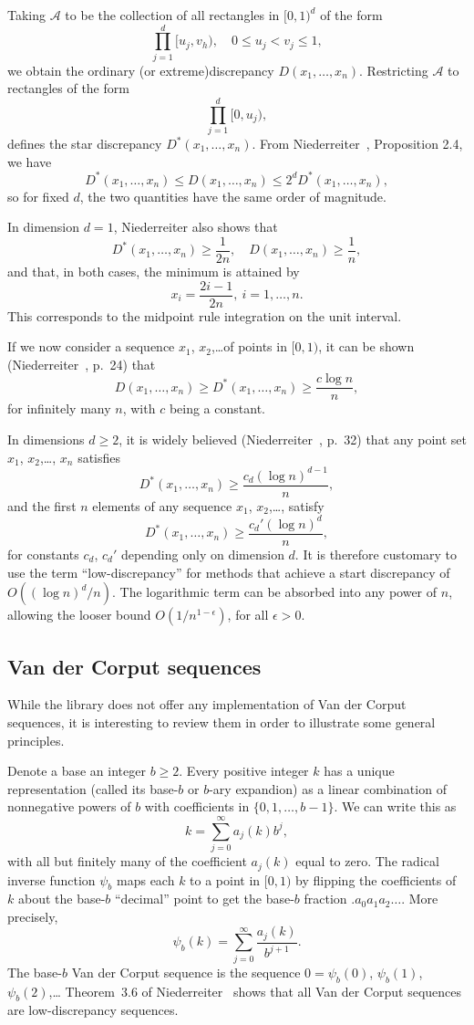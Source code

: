 Taking $\mathcal{A}$ to be the collection of all rectangles in
$[0,1)^d$ of the form
\[
\prod_{j = 1}^d [u_j, v_h),\quad 0 \leq u_j < v_j \leq 1,
\]
we obtain the ordinary (or extreme)discrepancy
$D(x_1,\ldots,x_n)$.
Restricting $\mathcal{A}$ to rectangles of the form
\[
\prod_{j = 1}^d [0,u_j),
\]
defines the star discrepancy
$D^*(x_1,\ldots,x_n)$.
From Niederreiter~\cite{Nied92}, Proposition 2.4, we have
\[
D^*(x_1,\ldots,x_n) \leq D(x_1,\ldots,x_n) \leq 2^d D^*(x_1,\ldots,x_n),
\]
so for fixed $d$, the two quantities have the same order of magnitude.

In dimension $d = 1$, Niederreiter also shows that
\[
D^*(x_1,\ldots,x_n) \geq \frac{1}{2n},\quad D(x_1,\ldots,x_n) \geq \frac{1}{n},
\]
and that, in both cases, the minimum is attained by
\[
x_i = \frac{2i-1}{2n},\ i = 1,\ldots,n.
\]
This corresponds to the midpoint rule integration on the unit
interval.

If we now consider a sequence $x_1$, $x_2$,\ldots of points in
$[0,1)$, it can be shown (Niederreiter~\cite{Nied92}, p.~24) that
\[
D(x_1,\ldots,x_n) \geq D^*(x_1,\ldots,x_n) \geq \frac{c \log n}{n},
\]
for infinitely many $n$, with $c$ being a constant.

In dimensions $d \geq 2$, it is widely believed
(Niederreiter~\cite{Nied92}, p.~32) that any point set $x_1$,
$x_2$,\ldots, $x_n$ satisfies
\[
D^*(x_1,\ldots,x_n) \geq \frac{c_d (\log n)^{d-1}}{n},
\]
and the first $n$ elements of any sequence $x_1$, $x_2$,\ldots,
satisfy
\[
D^*(x_1,\ldots,x_n) \geq \frac{c_d' (\log n)^{d}}{n},
\]
for constants $c_d$, $c_d'$ depending only on dimension $d$. It is
therefore customary to use the term ``low-discrepancy'' for methods
that achieve a start discrepancy of $O((\log n)^d/n)$.
The logarithmic term can be absorbed into any power of $n$, allowing
the looser bound $O(1/n^{1-\epsilon})$, for all $\epsilon > 0$.

\subsection{Van der Corput sequences}

While the library does not offer any implementation of Van der Corput
sequences, it is interesting to review them in order to illustrate
some general principles.

Denote a base an integer $b \geq 2$. Every positive integer $k$ has a
unique representation (called its base-$b$ or $b$-ary expandion) as a
linear combination of nonnegative powers of $b$ with coefficients in
$\lbrace 0, 1,\ldots, b-1 \rbrace$.
We can write this as
\[
k = \sum_{j = 0}^\infty a_j(k) b^j,
\]
with all but finitely many of the coefficient $a_j(k)$ equal to zero.
The radical inverse function $\psi_b$ maps each $k$ to a point in
$[0,1)$ by flipping the coefficients of $k$ about the base-$b$
``decimal'' point to get the base-$b$ fraction $.a_0a_1a_2\ldots$.
More precisely,
\[
\psi_b(k) = \sum_{j = 0}^\infty \frac{a_j(k)}{b^{j+1}}.
\]
The base-$b$ Van der Corput sequence is the sequence $0 = \psi_b(0)$,
$\psi_b(1)$, $\psi_b(2)$,\ldots
Theorem~3.6 of Niederreiter~\cite{Nied92} shows that all Van der
Corput sequences are low-discrepancy sequences.

